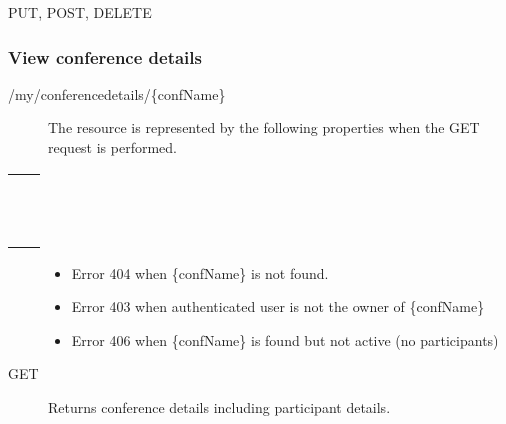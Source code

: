 \documentclass[letterpaper,10pt,english]{sphinxmanual}
\begin{document}
 PUT, POST, DELETE


\subsubsection{View conference details}
\label{\detokenize{restapi:view-conference-details}}
 /my/conferencedetails/\{confName\}
\begin{description}
\item[{}] \leavevmode
The resource is represented by the following properties when the GET request is performed.

\end{description}


\begin{savenotes}\sphinxattablestart
\centering
\begin{tabulary}{\linewidth}[t]{|T|T|}
\hline

&
\\
\hline
{}
&\\
\hline
{}
&\\
\hline
{}
&\\
\hline
{}
&\\
\hline
{}
&\\
\hline
{}
&\\
\hline
{}
&\\
\hline
{}
&\\
\hline
{}
&\\
\hline
{}
&\\
\hline
{}
&\\
\hline
{}
&\\
\hline
\end{tabulary}
\par
\sphinxattableend\end{savenotes}
\begin{description}
\item[{}] \leavevmode\begin{itemize}
\item {} 
Error 404 when \{confName\} is not found.

\item {} 
Error 403 when authenticated user is not the owner of \{confName\}

\item {} 
Error 406 when \{confName\} is found but not active (no participants)

\end{itemize}

\item[{ GET}] \leavevmode
Returns conference details including participant details.

\end{description}
\end{document}

